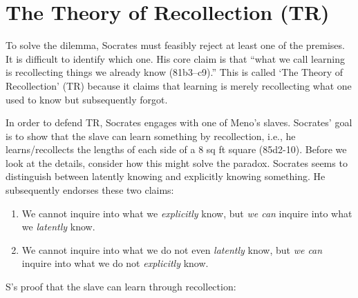 \documentclass[10 pt]{article}
\begin{document}
\section*{The Theory of Recollection (TR)}
To solve the dilemma, Socrates must feasibly reject at least one of the premises. It is difficult to identify which one. His core claim is that ``what we call learning is recollecting things we already know (81b3--c9).'' This is called `The Theory of Recollection' (TR) because it claims that learning is merely recollecting what one used to know but subsequently forgot. 

In order to defend TR, Socrates engages with one of Meno's slaves. Socrates' goal is to show that the slave can learn something by recollection, i.e., he learns/recollects the lengths of each side of a 8 sq ft square (85d2-10). Before we look at the details, consider how this might solve the paradox. Socrates seems to distinguish between latently knowing and explicitly knowing something. He subsequently endorses these two claims:  

\begin{enumerate}
\item We cannot inquire into what we \emph{explicitly} know, but \emph{we can} inquire into what we \emph{latently} know. 
\item We cannot inquire into what we do not even \emph{latently} know, but \emph{we can} inquire into what we do not \emph{explicitly} know.
\end{enumerate}



\noindent S's proof that the slave can learn through recollection:
\end{document}

